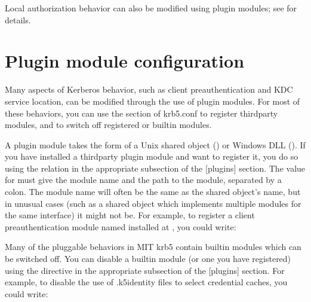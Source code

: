\documentclass[letterpaper,10pt,english]{sphinxmanual}
\begin{document}
\sphinxAtStartPar
Local authorization behavior can also be modified using plugin
modules; see  for details.


\section{Plugin module configuration}
\label{\detokenize{admin/host_config:plugin-module-configuration}}\label{\detokenize{admin/host_config:plugin-config}}
\sphinxAtStartPar
Many aspects of Kerberos behavior, such as client preauthentication
and KDC service location, can be modified through the use of plugin
modules.  For most of these behaviors, you can use the {\hyperref[\detokenize{admin/conf_files/krb5_conf:plugins}]{}}
section of krb5.conf to register third\sphinxhyphen{}party modules, and to switch
off registered or built\sphinxhyphen{}in modules.

\sphinxAtStartPar
A plugin module takes the form of a Unix shared object
() or Windows DLL ().  If you have
installed a third\sphinxhyphen{}party plugin module and want to register it, you do
so using the  relation in the appropriate subsection of the
{[}plugins{]} section.  The value for  must give the module name
and the path to the module, separated by a colon.  The module name
will often be the same as the shared object’s name, but in unusual
cases (such as a shared object which implements multiple modules for
the same interface) it might not be.  For example, to register a
client preauthentication module named  installed at
, you could write:

\begin{sphinxVerbatim}[commandchars=\\\{\}]
\PYG{p}{[}\PYG{p}{]}
      
          
\end{sphinxVerbatim}

\sphinxAtStartPar
Many of the pluggable behaviors in MIT krb5 contain built\sphinxhyphen{}in modules
which can be switched off.  You can disable a built\sphinxhyphen{}in module (or one
you have registered) using the  directive in the
appropriate subsection of the {[}plugins{]} section.  For example, to
disable the use of .k5identity files to select credential caches, you
could write:
\end{document}
